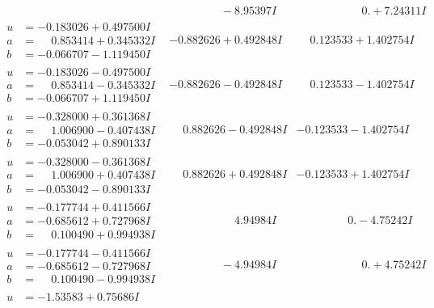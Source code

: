 \documentclass[1p]{elsarticle_modified}
\theoremstyle{definition}
\begin{document}
$$\begin{array}{c|c|c}
 & \phantom{-0.000000 } -8.95397 I & \phantom{-0.000000 -}0. + 7.24311 I \\ \hline\begin{aligned}
u &= -0.183026 + 0.497500 I \\
a &= \phantom{-}0.853414 + 0.345332 I \\
b &= -0.066707 - 1.119450 I\end{aligned}
 & -0.882626 + 0.492848 I & \phantom{-}0.123533 + 1.402754 I \\ \hline\begin{aligned}
u &= -0.183026 - 0.497500 I \\
a &= \phantom{-}0.853414 - 0.345332 I \\
b &= -0.066707 + 1.119450 I\end{aligned}
 & -0.882626 - 0.492848 I & \phantom{-}0.123533 - 1.402754 I \\ \hline\begin{aligned}
u &= -0.328000 + 0.361368 I \\
a &= \phantom{-}1.006900 - 0.407438 I \\
b &= -0.053042 + 0.890133 I\end{aligned}
 & \phantom{-}0.882626 - 0.492848 I & -0.123533 - 1.402754 I \\ \hline\begin{aligned}
u &= -0.328000 - 0.361368 I \\
a &= \phantom{-}1.006900 + 0.407438 I \\
b &= -0.053042 - 0.890133 I\end{aligned}
 & \phantom{-}0.882626 + 0.492848 I & -0.123533 + 1.402754 I \\ \hline\begin{aligned}
u &= -0.177744 + 0.411566 I \\
a &= -0.685612 + 0.727968 I \\
b &= \phantom{-}0.100490 + 0.994938 I\end{aligned}
 & \phantom{-0.000000 -}4.94984 I & \phantom{-0.000000 } 0. - 4.75242 I \\ \hline\begin{aligned}
u &= -0.177744 - 0.411566 I \\
a &= -0.685612 - 0.727968 I \\
b &= \phantom{-}0.100490 - 0.994938 I\end{aligned}
 & \phantom{-0.000000 } -4.94984 I & \phantom{-0.000000 -}0. + 4.75242 I \\ \hline\begin{aligned}
u &= -1.53583 + 0.75686 I \\

\end{aligned}
\end{array}$$
\end{document}
